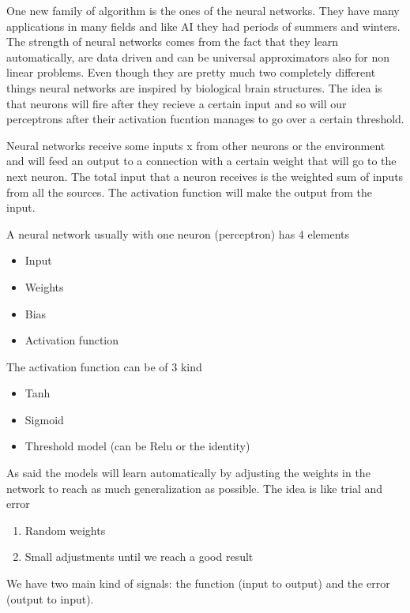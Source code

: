 One new family of algorithm is the ones of the neural networks. They have many applications in many fields and like
AI they had periods of summers and winters. The strength of neural networks comes from
the fact that they learn automatically, are data driven and can be universal approximators also
for non linear problems. Even though they are pretty much two completely different things 
neural networks are inspired by biological brain structures. The idea is that neurons will fire after they recieve 
a certain input and so will our perceptrons after their activation fucntion manages to go over a certain threshold.

\vspace{10 pt}

Neural networks receive some inputs x from other neurons or the environment and will feed an output to a connection with a certain weight that will go to the next neuron.
The total input that a neuron receives is the weighted sum of inputs from all the sources. The activation function will make the output from the input.

A neural network usually with one neuron (perceptron) has 4 elements

\begin{itemize}
    \item Input 
    \item Weights
    \item Bias
    \item Activation function
\end{itemize}

The activation function can be of 3 kind

\begin{itemize}
    \item Tanh
    \item Sigmoid
    \item Threshold model (can be Relu or the identity)
\end{itemize}

As said the models will learn automatically by adjusting the weights in the network to reach as much generalization as possible.
The idea is like trial and error
\begin{enumerate}
    \item Random weights
    \item Small adjustments until we reach a good result
\end{enumerate}

We have two main kind of signals: the function (input to output) and the error (output to input).

